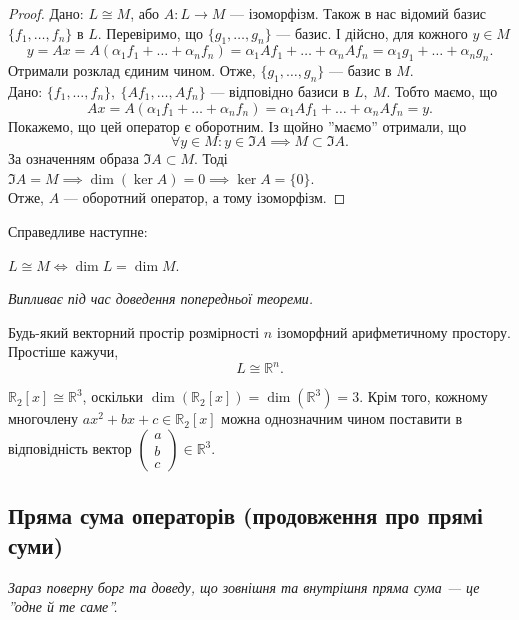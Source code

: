 \documentclass{math_library}
\begin{document}
	\begin{proof}
	\rightproof Дано: $L \cong M$, або $A \colon L \to M$ --- ізоморфізм. Також в нас відомий базис $\{f_1,\dots,f_n\}$ в $L$. Перевіримо, що $\{g_1,\dots,g_n\}$ --- базис. І дійсно, для кожного $y \in M$
	\[
	y = Ax = A(\alpha_1 f_1 + \dots + \alpha_n f_n) = \alpha_1 Af_1 + \dots + \alpha_n Af_n = \alpha_1 g_1 + \dots + \alpha_n g_n.
	\]
	Отримали розклад єдиним чином. Отже, $\{g_1,\dots,g_n\}$ --- базис в $M$.
	\bigskip \\
	\leftproof Дано: $\{f_1,\dots,f_n\},\ \{Af_1,\dots,Af_n\}$ --- відповідно базиси в $L,\ M$. Тобто маємо, що
	\[
	Ax = A(\alpha_1 f_1 + \dots + \alpha_n f_n) = \alpha_1 Af_1 + \dots + \alpha_n Af_n = y.
	\]
	Покажемо, що цей оператор є оборотним. Із щойно ''маємо'' отримали, що 
	\[
	\forall y \in M: y \in \Im A \implies M \subset \Im A.
	\]
	За означенням образа $\Im A \subset M$. Тоді $\Im A = M \implies \dim(\ker A) = 0 \implies \ker A = \{0\}$.\\
	Отже, $A$ --- оборотний оператор, а тому ізоморфізм.
	\end{proof}
	
	\begin{theorem}
	Справедливе наступне:
	\begin{center}
	$L \cong M \iff \dim L = \dim M$.
	\end{center}
	\textit{Випливає під час доведення попередньої теореми.}
	\end{theorem}
	
	\begin{corollary}
	Будь-який векторний простір розмірності $n$ ізоморфний арифметичному простору. Простіше кажучи,
	\[
	L \cong \mathbb{R}^n.
	\]
	\end{corollary}
	
	\begin{example}
	$\mathbb{R}_2[x] \cong \mathbb{R}^3$, оскільки $\dim(\mathbb{R}_2[x]) = \dim (\mathbb{R}^3) = 3$. Крім того, кожному многочлену $ax^2 + bx +c \in \mathbb{R}_2[x]$ можна однозначним чином поставити в відповідність вектор $\begin{pmatrix}
	a \\ b \\ c
	\end{pmatrix} \in \mathbb{R}^3$. 
	\end{example}
	
	\subsection{Пряма сума операторів (продовження про прямі суми)}
	\textit{Зараз поверну борг та доведу, що зовнішня та внутрішня пряма сума --- це ''одне й те саме''.}
	
\end{document}
